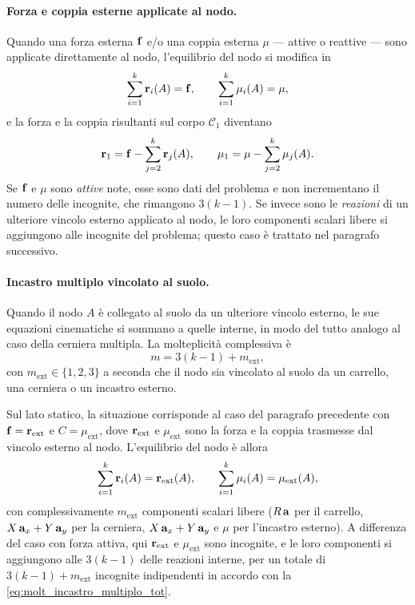 



\paragraph{Forza e coppia esterne applicate al nodo.}
Quando una forza esterna $\mathbf{f}$ e/o una coppia esterna $\mu$
--- attive o reattive --- sono applicate direttamente al
nodo, l'equilibrio del nodo si modifica in
\begin{equation}\label{eq:eq_nodo_FC}
	\sum_{i=1}^{k} \mathbf{r}_i(A) = \mathbf{f},
	\qquad
	\sum_{i=1}^{k} \mu_i(A) = \mu,
\end{equation}
e la forza e la coppia risultanti sul corpo
$\mathcal{C}_1$ diventano
\begin{equation}
	\mathbf{r}_1 = \mathbf{f} - \sum_{j=2}^{k} \mathbf{r}_j(A),
	\qquad
	\mu_1 = \mu - \sum_{j=2}^{k} \mu_j(A).
\end{equation}
Se $\mathbf{f}$ e $\mu$ sono \emph{attive} note, esse sono dati del
problema e non incrementano il numero delle incognite,
che rimangono $3(k-1)$. Se invece sono le \emph{reazioni}
di un ulteriore vincolo esterno applicato al nodo, le
loro componenti scalari libere si aggiungono alle
incognite del problema; questo caso è trattato nel
paragrafo successivo.

\paragraph{Incastro multiplo vincolato al suolo.}
Quando il nodo $A$ è collegato al suolo da un ulteriore
vincolo esterno, le sue equazioni cinematiche si sommano
a quelle interne, in modo del tutto analogo al caso della
cerniera multipla. La molteplicità complessiva è
\begin{equation}\label{eq:molt_incastro_multiplo_tot}
	m = 3(k-1) + m_\text{ext},
\end{equation}
con $m_\text{ext} \in \{1, 2, 3\}$ a seconda che il nodo
sia vincolato al suolo da un carrello, una cerniera o un
incastro esterno.

Sul lato statico, la situazione corrisponde al caso del
paragrafo precedente con $\mathbf{f} = \mathbf{r}_\text{ext}$ e
$C = \mu_\text{ext}$, dove $\mathbf{r}_\text{ext}$ e
$\mu_\text{ext}$ sono la forza e la coppia trasmesse dal
vincolo esterno al nodo. L'equilibrio del nodo è allora
\begin{equation}
	\sum_{i=1}^{k} \mathbf{r}_i(A) = \mathbf{r}_\text{ext}(A),
	\qquad
	\sum_{i=1}^{k} \mu_i(A) = \mu_\text{ext}(A),
\end{equation}
con complessivamente $m_\text{ext}$ componenti scalari
libere ($R\,\mathbf{a}$ per il carrello, $X\,\mathbf{a}_x + Y\,\mathbf{a}_y$
per la cerniera, $X\,\mathbf{a}_x + Y\,\mathbf{a}_y$ e $\mu$ per
l'incastro esterno). A differenza del caso con forza
attiva, qui $\mathbf{r}_\text{ext}$ e $\mu_\text{ext}$ sono
incognite, e le loro componenti si aggiungono alle
$3(k-1)$ delle reazioni interne, per un totale di
$3(k-1) + m_\text{ext}$ incognite indipendenti in accordo
con la \eqref{eq:molt_incastro_multiplo_tot}.


